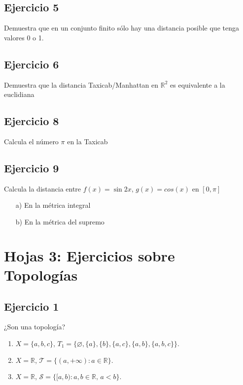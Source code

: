 \documentclass[12pt,a4paper]{article}
\begin{document}
\vspace{10cm}

\subsection*{Ejercicio 5}
Demuestra que en un conjunto finito sólo hay una distancia posible que tenga valores 0 o 1.

\vspace{10cm}

\subsection*{Ejercicio 6}
Demuestra que la distancia Taxicab/Manhattan en $\mathbb{R}^2$ es equivalente a la euclidiana
\vspace{10cm}

\subsection*{Ejercicio 8}
Calcula el número $\pi$ en la Taxicab

\vspace{10cm}

\subsection*{Ejercicio 9}
Calcula la distancia entre $f(x) = \sin{2x}$, $g(x) = cos(x)$ en $[0, \pi]$
\begin{itemize}
    \item[a)] En la métrica integral
    \item[b)] En la métrica del supremo
\end{itemize}

\vspace{10cm}


\newpage
\section*{Hojas 3: Ejercicios sobre Topologías}

\subsection*{Ejercicio 1}
¿Son una topología?
\begin{enumerate}
    \item $X=\{a,b,c\}$, $T_1=\{\varnothing,\{a\},\{b\},\{a,c\},\{a,b\},\{a,b,c\}\}$.
    \item $X=\mathbb{R}$, $\mathcal{T}=\{(a,+\infty):a\in\mathbb{R}\}$.
    \item $X=\mathbb{R}$, $\mathcal{S}=\{[a,b):a,b\in\mathbb{R},\,a<b\}$.
\end{enumerate}
\end{document}
